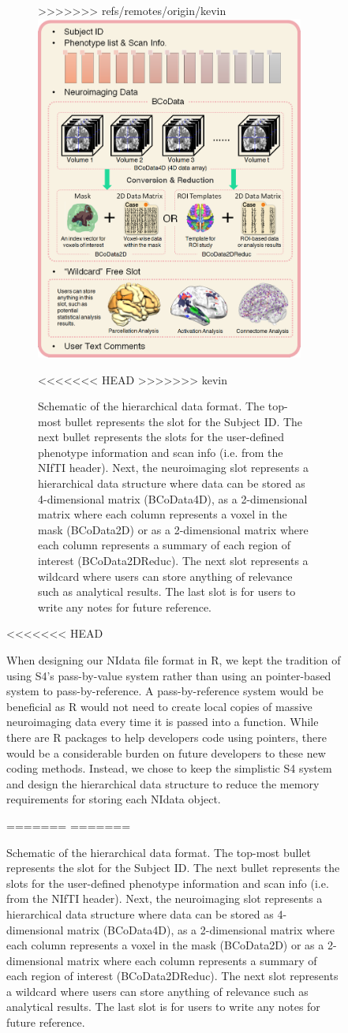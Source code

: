 \documentclass{nature}
\begin{document}
\begin{figure}[tb]
\begin{figure}[tb]
\centering
>>>>>>> refs/remotes/origin/kevin
\includegraphics[width=250pt]{fig/brainconductor/NIdata.png}
\caption{Schematic of the hierarchical data format. The top-most bullet represents
the slot for the Subject ID. The next bullet represents the slots for the user-defined
phenotype information and scan info (i.e. from the NIfTI header). Next, the neuroimaging
slot represents a hierarchical data structure where data can be stored as 4-dimensional
matrix (BCoData4D), as a 2-dimensional matrix where each column represents a voxel in
the mask (BCoData2D) or as a 2-dimensional matrix where each column represents a
summary of each region of interest (BCoData2DReduc). The next slot represents a wildcard
where users can store anything of relevance such as analytical results. The last
slot is for users to write any notes for future reference.}
<<<<<<< HEAD
>>>>>>> kevin
\label{fig:fileformat}
\end{figure}

<<<<<<< HEAD

When designing our NIdata file format in R, we kept the tradition of using S4's
pass-by-value system rather than using an pointer-based system to pass-by-reference.
A pass-by-reference system would be beneficial as R would not need to 
create local copies of massive neuroimaging data every time it is passed into a
function. While there are R packages to help developers
code using pointers\cite{bengtsson2003r}, there would be a 
considerable burden on future developers to these new coding methods.
Instead, we chose to keep the simplistic S4 system and design the hierarchical
data structure to reduce the memory requirements for storing each NIdata object.

=======
=======
\label{fig:fileformat}
\end{figure}
\end{document}
